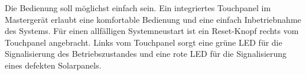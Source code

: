 Die  Bedienung  soll  m\"oglichst einfach  sein. Ein  integriertes  Touchpanel
im  Masterger\"at   erlaubt  eine  komfortable  Bedienung   und  eine  einfach
Inbetriebnahme des  Systems. F\"ur einen allf\"alligen Systemneustart  ist ein
Reset-Knopf rechts vom Touchpanel  angebracht. Links vom Touchpanel sorgt eine
gr\"une LED f\"ur  die Signalisierung des Betriebszustandes und  eine rote LED
f\"ur die Signalisierung eines defekten Solarpanels.
